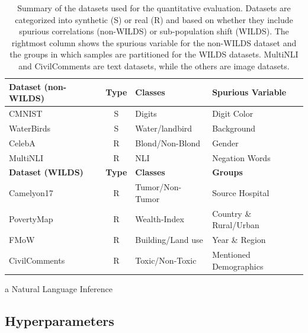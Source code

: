 \begin{table}[h]
\centering
\begin{threeparttable}
\begin{tabular}{lcll}\toprule
    \textbf{Dataset (non-WILDS)} & \textbf{Type} & \textbf{Classes} & \textbf{Spurious Variable} \\
    \midrule
    CMNIST \cite{gulrajani2021search} & S & Digits & Digit Color \\
    WaterBirds \cite{sagawa2020distributionally} & S & Water/landbird & Background \\
    CelebA \cite{liu2015deep} & R & Blond/Non-Blond & Gender \\
    MultiNLI \cite{williams2018broad} & R & NLI\tnote{a} & Negation Words \\
    \midrule
    \textbf{Dataset (WILDS)} & \textbf{Type} & \textbf{Classes} & \textbf{Groups} \\
    \midrule
    Camelyon17 \cite{bandi2019detection} & R & Tumor/Non-Tumor & Source Hospital \\
    PovertyMap \cite{yeh2020using} & R & Wealth-Index & Country \& Rural/Urban \\
    FMoW \cite{christie2018functional} & R & Building/Land use & Year \& Region \\
    CivilComments \cite{borkan2019nuanced} & R & Toxic/Non-Toxic & Mentioned Demographics\\
    \bottomrule
\end{tabular}
\begin{tablenotes}\footnotesize
\item [a] Natural Language Inference
\end{tablenotes}
\caption{Summary of the datasets used for the quantitative evaluation. Datasets are categorized into synthetic (S) or real (R) and based on whether they include spurious correlations (non-WILDS) or sub-population shift (WILDS). The rightmost column shows the spurious variable for the non-WILDS dataset and the groups in which samples are partitioned for the WILDS datasets. MultiNLI and CivilComments are text datasets, while the others are image datasets.}
\label{tab:all-datasets-summary}
\end{threeparttable}
\end{table}

\subsection{Hyperparameters}
\label{sec:hypparam}

